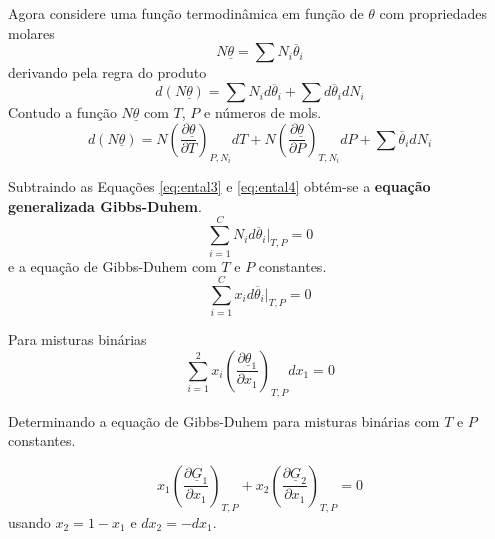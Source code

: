 Agora considere uma função termodinâmica em função de $\theta$ com propriedades molares
\begin{equation*}
    N\underline{\theta} =\sum N_i\overline{\theta}_i
\end{equation*}
derivando pela regra do produto
\begin{equation}\label{eq:ental4}
    d(N\underline{\theta}) = \sum N_i d\overline{\theta}_i + \sum  d\overline{\theta}_i d N_i
\end{equation}
Contudo a função $N\underline{\theta}$ com $T$, $P$ e números de mols.
\begin{equation}\label{eq:ental3}
    d(N\underline{\theta})= N\left(\dfrac{\partial \underline{\theta}}{\partial T}\right)_{P,N_{i}}dT + N\left(\dfrac{\partial \underline{\theta}}{\partial P}\right)_{T,N_{i}}dP+ \sum \overline{\theta}_idN_i
\end{equation}

Subtraindo as Equações \ref{eq:ental3} e \ref{eq:ental4} obtém-se a  \textbf{equação generalizada Gibbs-Duhem}.
\begin{equation}
    \displaystyle\sum_{i=1}^{C}N_id\overline{\theta}_i|_{T,P}=0
\end{equation}
e a equação de Gibbs-Duhem com $T$ e $P$ constantes.
\begin{equation}
    \displaystyle\sum_{i=1}^{C}x_id\overline{\theta}_i|_{T,P}=0
\end{equation}

Para misturas binárias 
\begin{equation}
    \displaystyle\sum_{i=1}^{2}x_i\left(\dfrac{\partial \underline{\theta}_1}{\partial x_1}\right)_{T,P}dx_1=0
\end{equation}

Determinando a equação de Gibbs-Duhem para misturas binárias com $T$ e $P$ constantes.

\begin{equation}
   x_1\left(\dfrac{\partial \underline{G}_1}{\partial x_1}\right)_{T,P}+ x_2\left(\dfrac{\partial \underline{G}_2}{\partial x_1}\right)_{T,P}=0
\end{equation}
usando $x_2=1-x_1$ e $dx_2=-dx_1$.

